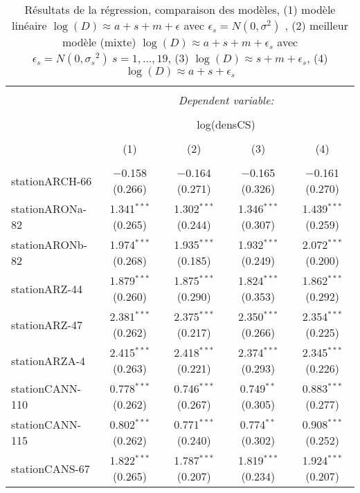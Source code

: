 
\begin{table}[!htbp] \centering 
  \caption{Résultats de la régression,
				comparaison des modèles, (1) modèle linéaire $\log (D){\approx}a+s+m+\epsilon$ avec $\epsilon_s=N(0,{\sigma}^2) $
				, (2) meilleur modèle (mixte) $\log (D){\approx}a+s+m+\epsilon_s$ avec $\epsilon_s=N(0,{\sigma_{s}}^2) ~s=1,\dots,19$,
				(3) $\log (D){\approx}s+m+\epsilon_s$,
				(4) $\log (D){\approx}a+s+\epsilon_s$} 
  \label{annex_regression_result} 
\begin{tabular}{@{\extracolsep{5pt}}lcccc} 
\\[-1.8ex]\hline 
\hline \\[-1.8ex] 
 & \multicolumn{4}{c}{\textit{Dependent variable:}} \\ 
\cline{2-5} 
\\[-1.8ex] & \multicolumn{4}{c}{log(densCS)} \\ 
\\[-1.8ex] & (1) & (2) & (3) & (4)\\ 
\hline \\[-1.8ex] 
 stationARCH-66 & $-$0.158 (0.266) & $-$0.164 (0.271) & $-$0.165 (0.326) & $-$0.161 (0.270) \\ 
  stationARONa-82 & 1.341$^{***}$ (0.265) & 1.302$^{***}$ (0.244) & 1.346$^{***}$ (0.307) & 1.439$^{***}$ (0.259) \\ 
  stationARONb-82 & 1.974$^{***}$ (0.268) & 1.935$^{***}$ (0.185) & 1.932$^{***}$ (0.249) & 2.072$^{***}$ (0.200) \\ 
  stationARZ-44 & 1.879$^{***}$ (0.260) & 1.875$^{***}$ (0.290) & 1.824$^{***}$ (0.353) & 1.862$^{***}$ (0.292) \\ 
  stationARZ-47 & 2.381$^{***}$ (0.262) & 2.375$^{***}$ (0.217) & 2.350$^{***}$ (0.266) & 2.354$^{***}$ (0.225) \\ 
  stationARZA-4 & 2.415$^{***}$ (0.263) & 2.418$^{***}$ (0.221) & 2.374$^{***}$ (0.293) & 2.345$^{***}$ (0.226) \\ 
  stationCANN-110 & 0.778$^{***}$ (0.262) & 0.746$^{***}$ (0.267) & 0.749$^{**}$ (0.305) & 0.883$^{***}$ (0.277) \\ 
  stationCANN-115 & 0.802$^{***}$ (0.262) & 0.771$^{***}$ (0.240) & 0.774$^{**}$ (0.302) & 0.908$^{***}$ (0.252) \\ 
  stationCANS-67 & 1.822$^{***}$ (0.265) & 1.787$^{***}$ (0.207) & 1.819$^{***}$ (0.234) & 1.924$^{***}$ (0.207) \\ 

\end{tabular}
\end{table}
